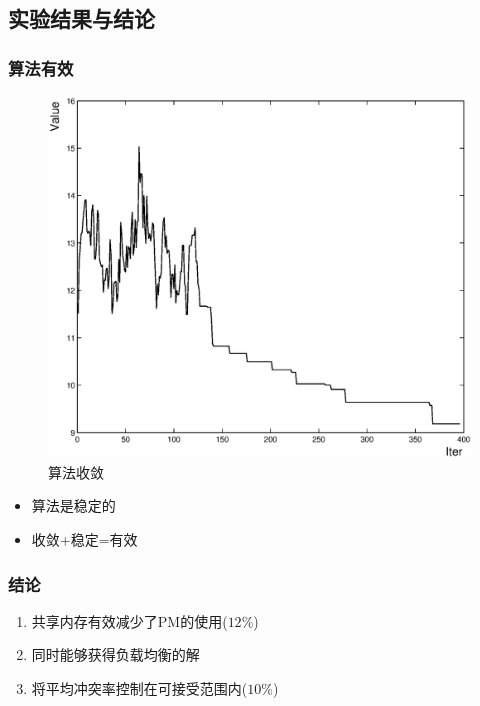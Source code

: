 \documentclass[slidestop,compress,mathserif,blue,12pt,adobefonts]{beamer}
\begin{document}
\subsection{实验结果与结论}
\begin{frame}
  \frametitle{算法有效}
  \begin{figure}[htbp]
    \centering 
    \includegraphics[scale=0.2]{../figures/feasibility.eps}
    \caption{算法收敛}
  \end{figure}
  \begin{itemize}
  \item 算法是稳定的
  \item 收敛+稳定=有效
  \end{itemize}
\end{frame}

\begin{frame}
  \frametitle{结论}
  \begin{enumerate}
  \item <1-> 共享内存有效减少了PM的使用($12\%$)
  \item <2-> 同时能够获得负载均衡的解
  \item <3-> 将平均冲突率控制在可接受范围内($10\%$)
  \end{enumerate}
\end{frame}
\end{document}
